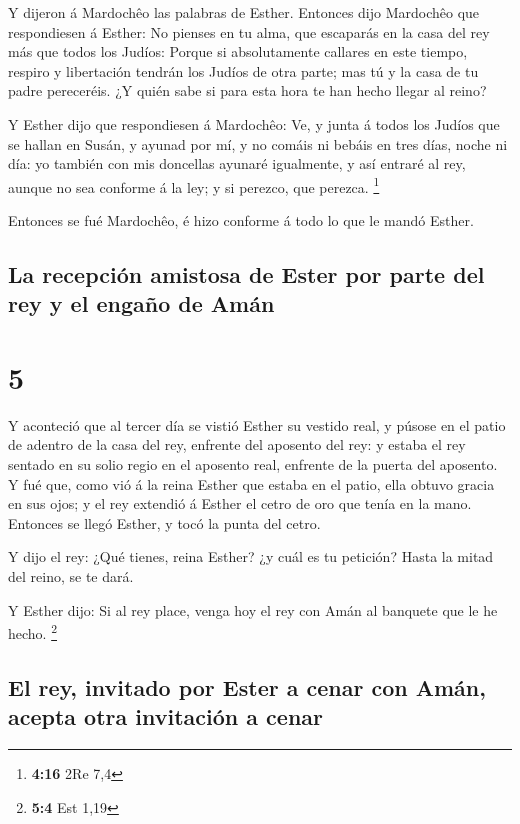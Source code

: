 Y dijeron á Mardochêo las palabras de Esther.
 Entonces dijo Mardochêo que respondiesen á Esther: No
pienses en tu alma, que escaparás en la casa del rey más que todos los
Judíos:  Porque si absolutamente callares en este tiempo,
respiro y libertación tendrán los Judíos de otra parte; mas tú y la casa
de tu padre pereceréis. ¿Y quién sabe si para esta hora te han hecho
llegar al reino?

 Y Esther dijo que respondiesen á Mardochêo: 
Ve, y junta á todos los Judíos que se hallan en Susán, y ayunad por mí,
y no comáis ni bebáis en tres días, noche ni día: yo también con mis
doncellas ayunaré igualmente, y así entraré al rey, aunque no sea
conforme á la ley; y si perezco, que perezca. \footnote{\textbf{4:16}
  2Re 7,4}

 Entonces se fué Mardochêo, é hizo conforme á todo lo que
le mandó Esther.

\hypertarget{la-recepciuxf3n-amistosa-de-ester-por-parte-del-rey-y-el-engauxf1o-de-amuxe1n}{%
\subsection{La recepción amistosa de Ester por parte del rey y el engaño
de
Amán}\label{la-recepciuxf3n-amistosa-de-ester-por-parte-del-rey-y-el-engauxf1o-de-amuxe1n}}

\hypertarget{section-4}{%
\section{5}\label{section-4}}

 Y aconteció que al tercer día se vistió Esther su vestido
real, y púsose en el patio de adentro de la casa del rey, enfrente del
aposento del rey: y estaba el rey sentado en su solio regio en el
aposento real, enfrente de la puerta del aposento.  Y fué
que, como vió á la reina Esther que estaba en el patio, ella obtuvo
gracia en sus ojos; y el rey extendió á Esther el cetro de oro que tenía
en la mano. Entonces se llegó Esther, y tocó la punta del cetro.

 Y dijo el rey: ¿Qué tienes, reina Esther? ¿y cuál es tu
petición? Hasta la mitad del reino, se te dará.

 Y Esther dijo: Si al rey place, venga hoy el rey con Amán
al banquete que le he hecho. \footnote{\textbf{5:4} Est 1,19}

\hypertarget{el-rey-invitado-por-ester-a-cenar-con-amuxe1n-acepta-otra-invitaciuxf3n-a-cenar}{%
\subsection{El rey, invitado por Ester a cenar con Amán, acepta otra
invitación a
cenar}\label{el-rey-invitado-por-ester-a-cenar-con-amuxe1n-acepta-otra-invitaciuxf3n-a-cenar}}

